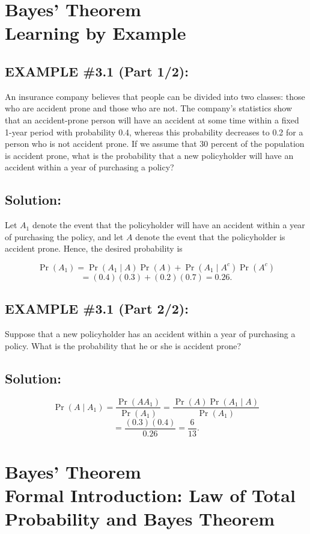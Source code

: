 \documentclass[12pt]{article}
\begin{document}
\section*{Bayes’ Theorem\\Learning by Example}

\subsection*{EXAMPLE \#3.1 (Part 1/2):}

An insurance company believes that people can be divided into two classes: those who are accident prone and those who are not. The company’s statistics show that an accident-prone person will have an accident at some time within a fixed 1-year period with probability 0.4, whereas this probability decreases to 0.2 for a person who is not accident prone. If we assume that 30 percent of the population is accident prone, what is the probability that a new policyholder will have an accident within a year of purchasing a policy?

\subsection*{Solution:}

Let $A_1$ denote the event that the policyholder will have an accident within a year of purchasing the policy, and let $A$ denote the event that the policyholder is accident prone. Hence, the desired probability is

\[
\Pr(A_1) = \Pr(A_1 \mid A)\Pr(A) + \Pr(A_1 \mid A^c)\Pr(A^c)
\]
\[
= (0.4)(0.3) + (0.2)(0.7) = 0.26.
\]

\subsection*{EXAMPLE \#3.1 (Part 2/2):}

Suppose that a new policyholder has an accident within a year of purchasing a policy. What is the probability that he or she is accident prone?

\subsection*{Solution:}

\[
\Pr(A \mid A_1) = \frac{\Pr(AA_1)}{\Pr(A_1)} = \frac{\Pr(A)\Pr(A_1 \mid A)}{\Pr(A_1)}
\]
\[
= \frac{(0.3)(0.4)}{0.26} = \frac{6}{13}.
\]

\section*{Bayes’ Theorem\\Formal Introduction: Law of Total Probability and Bayes Theorem}
\end{document}
